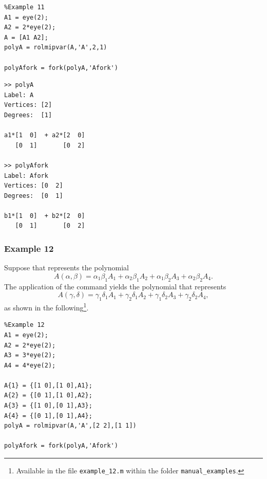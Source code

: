\documentclass[english,11pt]{article}
\theoremstyle{break} \theorembodyfont{\small\rm}
\begin{document}
\begin{minipage}{9.5cm}
 \begin{lstlisting}
%Example 11
A1 = eye(2);
A2 = 2*eye(2);
A = [A1 A2];
polyA = rolmipvar(A,'A',2,1)

polyAfork = fork(polyA,'Afork')
 \end{lstlisting}
\end{minipage}
\vspace{0.2cm}

\begin{minipage}{9.5cm}
\begin{lstlisting}[rulecolor=\color{red}]
>> polyA
Label: A
Vertices: [2]
Degrees:  [1]

a1*[1  0]  + a2*[2  0]
   [0  1]       [0  2]

>> polyAfork
Label: Afork
Vertices: [0  2]
Degrees:  [0  1]

b1*[1  0]  + b2*[2  0]
   [0  1]       [0  2]
\end{lstlisting}
\end{minipage}
\vspace{0.2cm}




\subsubsection*{Example 12}
Suppose that  represents the polynomial
\[
 A(\alpha,\beta) = \alpha_1 \beta_1 A_1 + \alpha_2 \beta_1 A_2  + \alpha_1 \beta_2 A_3 + \alpha_2 \beta_2 A_4.
\]
The application of the command  yields the polynomial 
that represents
\[
 A(\gamma,\delta) = \gamma_1 \delta_1 A_1 + \gamma_2 \delta_1 A_2  + \gamma_1 \delta_2 A_3 + \gamma_2 \delta_2 A_4,
\]
as shown in the following\footnote{Available in the file \texttt{example\_12.m} within the folder \texttt{manual\_examples}.}.

\begin{minipage}{9.5cm}
 \begin{lstlisting}
%Example 12
A1 = eye(2);
A2 = 2*eye(2);
A3 = 3*eye(2);
A4 = 4*eye(2);

A{1} = {[1 0],[1 0],A1};
A{2} = {[0 1],[1 0],A2};
A{3} = {[1 0],[0 1],A3};
A{4} = {[0 1],[0 1],A4};
polyA = rolmipvar(A,'A',[2 2],[1 1])

polyAfork = fork(polyA,'Afork')
 \end{lstlisting}
\end{minipage}
\vspace{0.2cm}
\end{document}
